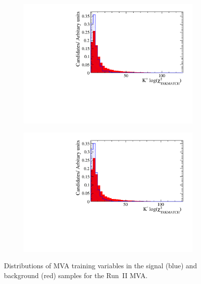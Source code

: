 \begin{figure}[!h]
\begin{subfigure}[t]{0.22\textwidth}
      \includegraphics[width=1.0\textwidth]{figs/Selection/Phi_BDT_Var_Ds2KKPi_Phi_K0_TRACK_MatchCHI2.pdf}
   \end{subfigure}
   \begin{subfigure}[t]{0.22\textwidth}
      \centering
      \includegraphics[width=1.0\textwidth]{figs/Selection/Phi_BDT_Var_Ds2KKPi_Phi_K1_TRACK_MatchCHI2.pdf}
   \end{subfigure}
   \caption{Distributions of MVA training variables in the signal (blue) and background (red) samples for the Run~II \decay{\phiz}{\Kp\Km} MVA.}
   \label{fig:mvatrainingvariables_phi}   
\end{figure}



